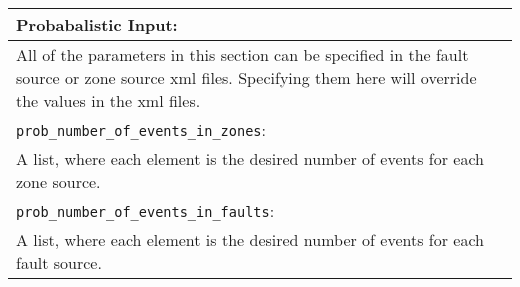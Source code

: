 \vspace{2em}
\begin{tabular}{|p{\textwidth}|}
\hline
\vspace{0.3em} \noindent \Large \textbf{Probabalistic Input:} \normalsize \\
\hline \vspace{0.1em}

All of the parameters in this section can be specified in the fault
source or zone source xml files.  Specifying them here will override
the values in the xml files.\\

\hline \vspace{0.1em} \texttt{prob\_number\_of\_events\_in\_zones}: \\
A list, where each element is the desired number of events for each
zone source.\\
\hline \vspace{0.1em} \texttt{prob\_number\_of\_events\_in\_faults}: \\
A list, where each element is the desired number of events for each
fault source.\\
\hline
 \end{tabular}
 
